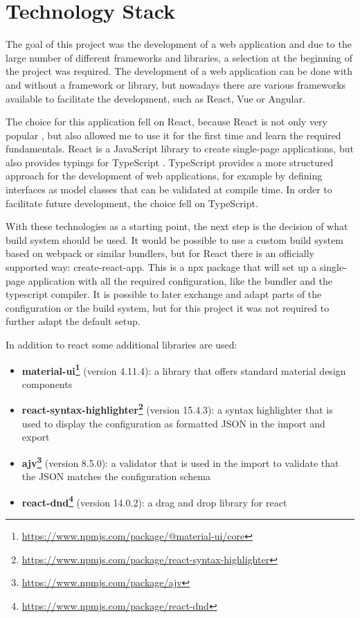 \chapter{Technology Stack}
\label{sec:tech_stack}
The goal of this project was the development of a web application and due to the large number of different frameworks and libraries, a selection at the beginning of the project was required. The development of a web application can be done with and without a framework or library, but nowadays there are various frameworks available to facilitate the development, such as React, Vue or Angular.

The choice for this application fell on React, because React is not only very popular \cite{2020DeveloperSurvey}, but also allowed me to  use it for the first time and learn the required fundamentals. React is a JavaScript library to create single-page applications, but also provides typings for TypeScript \cite{createReactApp}. TypeScript provides a more structured approach for the development of web applications, for example by defining interfaces as model classes that can be validated at compile time. In order to facilitate future development, the choice fell on TypeScript. 

With these technologies as a starting point, the next step is the decision of what build system should be used. It would be possible to use a custom build system based on webpack or similar bundlers, but for React there is an officially supported way: create-react-app. This is a npx package that will set up a single-page application with all the required configuration, like the bundler and the typescript compiler. It is possible to later exchange and adapt parts of the configuration or the build system, but for this project it was not required to further adapt the default setup.

In addition to react some additional libraries are used:

\begin{itemize}
    \item \textbf{material-ui\footnote{\url{https://www.npmjs.com/package/@material-ui/core}}} (version 4.11.4): a library that offers standard material design components
    \item \textbf{react-syntax-highlighter\footnote{\url{https://www.npmjs.com/package/react-syntax-highlighter}}} (version 15.4.3): a syntax highlighter that is used to display the configuration as formatted JSON in the import and export 
    \item \textbf{ajv\footnote{\url{https://www.npmjs.com/package/ajv}}} (version 8.5.0): a validator that is used in the import to validate that the JSON matches the configuration schema
    \item \textbf{react-dnd\footnote{\url{https://www.npmjs.com/package/react-dnd}}} (version 14.0.2): a drag and drop library for react
\end{itemize}

\newpage